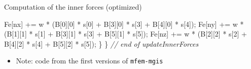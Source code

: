 \documentclass{beamer}
\providecommand{\tightlist}{%
  \setlength{\itemsep}{0pt}\setlength{\parskip}{0pt}}
\newenvironment{Shaded}{}{}
\newcommand{\CommentTok}[1]{\textcolor[rgb]{0.38,0.63,0.69}{\textit{#1}}}
\newcommand{\DecValTok}[1]{\textcolor[rgb]{0.25,0.63,0.44}{#1}}
\newcommand{\NormalTok}[1]{#1}
\begin{document}
\begin{frame}[fragile]{Computation of the inner forces (optimized)}
\begin{Shaded}
\begin{Highlighting}[]
\NormalTok{      Fe[nx] += w * (B[}\DecValTok{0}\NormalTok{][}\DecValTok{0}\NormalTok{] * s[}\DecValTok{0}\NormalTok{] + B[}\DecValTok{3}\NormalTok{][}\DecValTok{0}\NormalTok{] * s[}\DecValTok{3}\NormalTok{] + B[}\DecValTok{4}\NormalTok{][}\DecValTok{0}\NormalTok{] * s[}\DecValTok{4}\NormalTok{]);}
\NormalTok{      Fe[ny] += w * (B[}\DecValTok{1}\NormalTok{][}\DecValTok{1}\NormalTok{] * s[}\DecValTok{1}\NormalTok{] + B[}\DecValTok{3}\NormalTok{][}\DecValTok{1}\NormalTok{] * s[}\DecValTok{3}\NormalTok{] + B[}\DecValTok{5}\NormalTok{][}\DecValTok{1}\NormalTok{] * s[}\DecValTok{5}\NormalTok{]);}
\NormalTok{      Fe[nz] += w * (B[}\DecValTok{2}\NormalTok{][}\DecValTok{2}\NormalTok{] * s[}\DecValTok{2}\NormalTok{] + B[}\DecValTok{4}\NormalTok{][}\DecValTok{2}\NormalTok{] * s[}\DecValTok{4}\NormalTok{] + B[}\DecValTok{5}\NormalTok{][}\DecValTok{2}\NormalTok{] * s[}\DecValTok{5}\NormalTok{]);}
\NormalTok{    \}}
\NormalTok{  \}  }\CommentTok{// end of updateInnerForces}
\end{Highlighting}
\end{Shaded}

\begin{itemize}
\tightlist
\item
  Note: code from the first versions of \texttt{mfem-mgis}
\end{itemize}
\end{frame}
\end{document}
